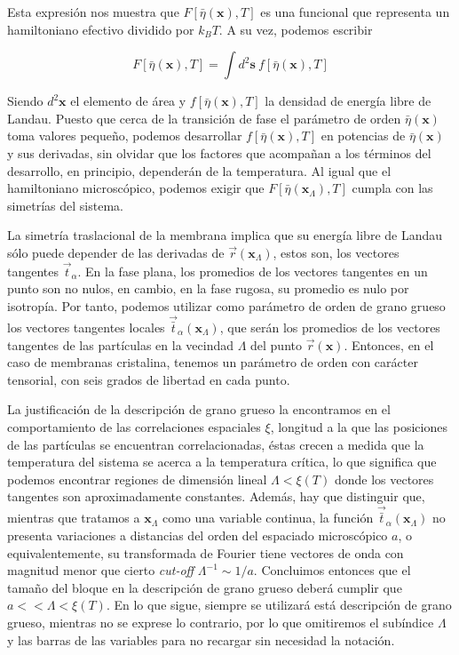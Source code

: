 Esta expresión nos muestra que $F[\bar{\eta}(\mathbf{x}),T]$ es una funcional
que representa un hamiltoniano efectivo dividido por $k_BT$. A su vez, podemos
escribir 

\begin{equation*}
F[\bar{\eta}(\mathbf{x}),T]=\int\! d^2\mathbf{s}\ f[\bar{\eta}(\mathbf{x}),T]
\end{equation*}

Siendo $d^2\mathbf{x}$ el elemento de área y $f[\bar{\eta}(\mathbf{x}),T]$ la
densidad de energía libre de Landau. Puesto que cerca de la transición de fase
el parámetro de orden $\bar{\eta}(\mathbf{x})$ toma valores pequeño, podemos
desarrollar $f[\bar{\eta}(\mathbf{x}),T]$ en potencias de
$\bar{\eta}(\mathbf{x})$ y sus derivadas, sin olvidar que los factores que
acompañan a los términos del desarrollo, en principio, dependerán de la
temperatura. Al igual que el hamiltoniano microscópico, podemos exigir que
$F[\bar{\eta}(\mathbf{x}_{\Lambda}),T]$ cumpla con las simetrías del sistema.

La simetría traslacional de la membrana implica que su energía libre de Landau
sólo puede depender de las derivadas de $\vec{r}(\mathbf{x}_{\Lambda})$, estos
son, los vectores tangentes $\vec{t}_{\alpha}$. En la fase
plana, los promedios de los vectores tangentes en un punto son no nulos, en
cambio, en la fase rugosa, su promedio es nulo por isotropía. Por tanto,
podemos utilizar como  parámetro de orden de grano grueso los vectores
tangentes locales $\vec{\bar{t}}_{\alpha}(\mathbf{x}_{\Lambda})$, que serán
los promedios de los vectores tangentes de las partículas en la vecindad
$\Lambda$ del punto $\vec{r}(\mathbf{x})$. Entonces, en el caso de
membranas cristalina, tenemos un parámetro de orden con carácter tensorial,
con seis grados de libertad en cada punto.

La justificación de la descripción de grano grueso la encontramos en el
comportamiento de las correlaciones espaciales $\xi$, longitud a la que las
posiciones de las partículas se encuentran correlacionadas, éstas crecen a
medida que la temperatura del sistema se acerca a la temperatura crítica, lo
que significa que podemos encontrar regiones de dimensión lineal
$\Lambda<\xi(T)$ donde los vectores tangentes son aproximadamente
constantes. Además, hay que distinguir que, mientras que tratamos a
$\mathbf{x}_{\Lambda}$ como una variable continua, la función 
$\vec{\bar{t}}_{\alpha}(\mathbf{x}_{\Lambda})$ no presenta variaciones a distancias
del orden del espaciado microscópico $a$, o equivalentemente, su transformada
de Fourier tiene vectores de onda con magnitud menor que cierto \textit{cut-off}
$\Lambda^{-1} \sim 1/a$. Concluimos entonces que el tamaño del bloque en la
descripción de grano grueso deberá cumplir que $a<<\Lambda<\xi(T)$. En lo que
sigue, siempre se utilizará está descripción de grano grueso, mientras no se
exprese lo contrario, por lo que omitiremos el subíndice $\Lambda$ y las
barras de las variables para no recargar sin necesidad la notación.

